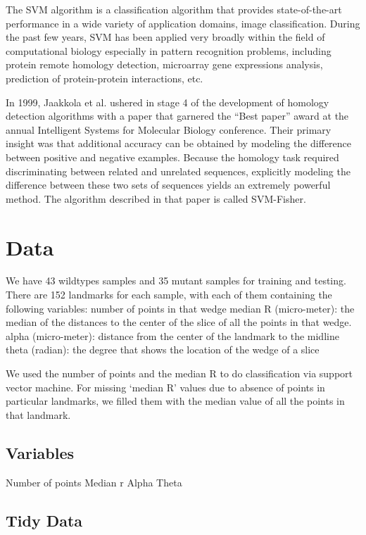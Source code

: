 \documentclass[10pt,letterpaper]{article}
\begin{document}
The SVM algorithm is a classification algorithm that provides
state-of-the-art performance in a wide variety of application domains,
image classification. During the past few years, SVM has been applied
very broadly within the field of computational biology especially in
pattern recognition problems, including protein remote homology
detection, microarray gene expressions analysis, prediction of
protein-protein interactions, etc.

In 1999, Jaakkola et al. ushered in stage 4 of the development of
homology detection algorithms with a paper that garnered the ``Best
paper'' award at the annual Intelligent Systems for Molecular Biology
conference. Their primary insight was that additional accuracy can be
obtained by modeling the difference between positive and negative
examples. Because the homology task required discriminating between
related and unrelated sequences, explicitly modeling the difference
between these two sets of sequences yields an extremely powerful method.
The algorithm described in that paper is called SVM-Fisher.

\section{Data}\label{data}

We have 43 wildtypes samples and 35 mutant samples for training and
testing. There are 152 landmarks for each sample, with each of them
containing the following variables: number of points in that wedge
median R (micro-meter): the median of the distances to the center of the
slice of all the points in that wedge. alpha (micro-meter): distance
from the center of the landmark to the midline theta (radian): the
degree that shows the location of the wedge of a slice

We used the number of points and the median R to do classification via
support vector machine. For missing `median R' values due to absence of
points in particular landmarks, we filled them with the median value of
all the points in that landmark.

\subsection{Variables}\label{variables}

Number of points Median r Alpha Theta

\subsection{Tidy Data}\label{tidy-data}
\end{document}

